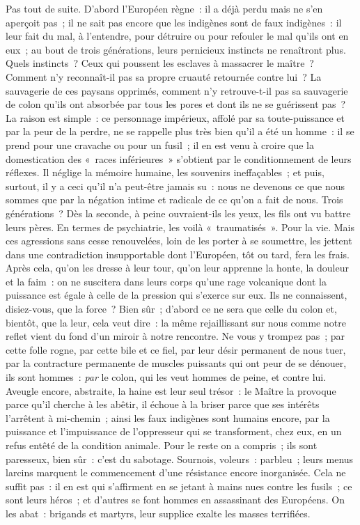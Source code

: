 \documentclass[french,twoside]{book} %
\begin{document}
Pas tout de suite. D’abord l’Européen règne : il a déjà perdu mais ne s’en aperçoit pas ; il ne sait pas encore que les indigènes sont de faux indigènes : il leur fait du mal, à l’entendre, pour   détruire ou pour refouler le mal qu’ils ont en eux ; au bout de trois générations, leurs pernicieux instincts ne renaîtront plus. Quels instincts ? Ceux qui poussent les esclaves à massacrer le maître ? Comment n’y reconnaît-il pas sa propre cruauté retournée contre lui ? La sauvagerie de ces paysans opprimés, comment n’y retrouve-t-il pas sa sauvagerie de colon qu’ils ont absorbée par tous les pores et dont ils ne se guérissent pas ? La raison est simple : ce personnage impérieux, affolé par sa toute-puissance et par la peur de la perdre, ne se rappelle plus très bien qu’il a été un homme : il se prend pour une cravache ou pour un fusil ; il en est venu à croire que la domestication des « races inférieures » s’obtient par le conditionnement de leurs réflexes. Il néglige la mémoire humaine, les souvenirs ineffaçables ; et puis, surtout, il y a ceci qu’il n’a peut-être jamais su : nous ne devenons ce que nous sommes que par la négation intime et radicale de ce qu’on a fait de nous. Trois générations ? Dès la seconde, à peine ouvraient-ils les yeux, les fils ont vu battre leurs pères. En termes de psychiatrie, les voilà « traumatisés ». Pour la vie. Mais ces agressions sans cesse renouvelées, loin de les porter à se soumettre, les jettent dans une contradiction insupportable dont l’Européen, tôt ou tard, fera les frais. Après cela, qu’on les dresse à leur tour, qu’on leur apprenne la honte, la douleur et la faim : on ne suscitera dans leurs corps qu’une rage volcanique dont la puissance est égale à celle de la pression qui s’exerce sur eux. Ils ne connaissent, disiez-vous, que la force ? Bien sûr ; d’abord ce ne sera que celle du colon et, bientôt, que la leur, cela veut dire : la même rejaillissant sur nous comme notre reflet vient du fond d’un miroir à notre rencontre. Ne vous y trompez pas ; par cette folle rogne, par cette bile et ce fiel, par leur désir permanent de nous tuer, par la contracture permanente de muscles puissants qui ont peur de se dénouer, ils sont hommes : \emph{par} le colon, qui les veut hommes de peine, et contre lui. Aveugle encore, abstraite, la haine est leur seul trésor : le Maître la provoque parce qu’il cherche à les abêtir, il échoue à la briser parce que ses intérêts l’arrêtent à mi-chemin ; ainsi les faux indigènes sont humains encore, par la puissance et   l’impuissance de l’oppresseur qui se transforment, chez eux, en un refus entêté de la condition animale. Pour le reste on a compris ; ils sont paresseux, bien sûr : c’est du sabotage. Sournois, voleurs : parbleu ; leurs menus larcins marquent le commencement d’une résistance encore inorganisée. Cela ne suffit pas : il en est qui s’affirment en se jetant à mains nues contre les fusils ; ce sont leurs héros ; et d’autres se font hommes en assassinant des Européens. On les abat : brigands et martyrs, leur supplice exalte les masses terrifiées.\par
\end{document}
